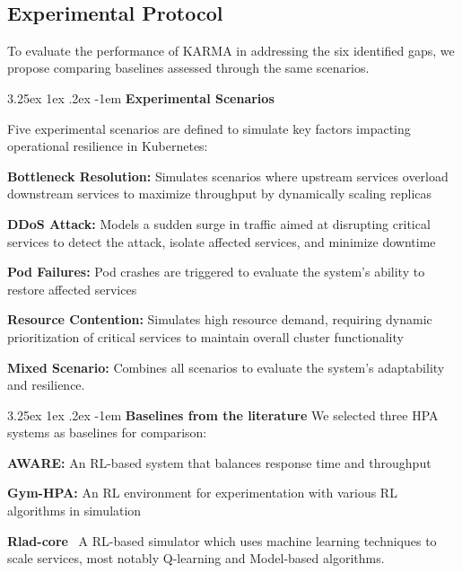 \documentclass[conference]{IEEEtran}
\makeatletter
\renewcommand\paragraph{\@startsection{paragraph}{5}{\z@}%
  {3.25ex \@plus1ex \@minus.2ex}%
  {-1em}%
  {\normalfont\normalsize\bfseries}}
\makeatother
\begin{document}
\

\subsection{Experimental Protocol}

\noindent To evaluate the performance of KARMA in addressing the six identified gaps, we propose comparing baselines assessed through the same scenarios.

\paragraph{\textbf{Experimental Scenarios}}

\noindent Five experimental scenarios are defined to simulate key factors impacting operational resilience in Kubernetes:
%
\begin{enumerate*}[label=\textbf{\arabic*)}, itemjoin={;\quad }]
    \item \textbf{Bottleneck Resolution:} Simulates scenarios where upstream services overload downstream services to maximize throughput by dynamically scaling replicas
    \item \textbf{DDoS Attack:} Models a sudden surge in traffic aimed at disrupting critical services to detect the attack, isolate affected services, and minimize downtime~\cite{Liu2018}
    \item \textbf{Pod Failures:} Pod crashes are triggered to evaluate the system's ability to restore affected services~\cite{burns2016borg}
    \item \textbf{Resource Contention:} Simulates high resource demand, requiring dynamic prioritization of critical services to maintain overall cluster functionality~\cite{Vhatkar2022}
    \item \textbf{Mixed Scenario:} Combines all scenarios to evaluate the system's adaptability and resilience.
\end{enumerate*}

\paragraph{\textbf{Baselines from the literature}}
%
\noindent We selected three HPA systems as baselines for comparison:
\begin{enumerate*}[label=\textbf{\arabic*)}, itemjoin={;\quad }]
    \item \textbf{AWARE:} An RL-based system that balances response time and throughput~\cite{aware2023}
    \item \textbf{Gym-HPA:} An RL environment for experimentation with various RL algorithms in simulation~\cite{gymhpa2022}
    \item \textbf{Rlad-core}~\cite{Rossi2019} A RL-based simulator which uses machine learning techniques to scale services, most notably Q-learning and Model-based algorithms.
\end{enumerate*}
\end{document}

